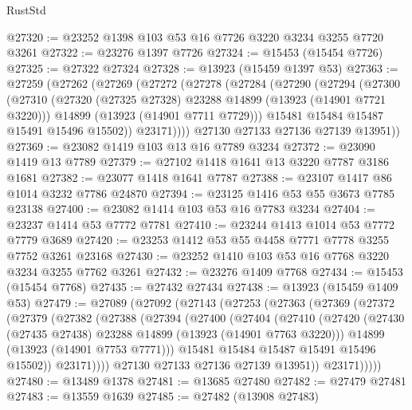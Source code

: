 \begin{lexlean}{RustStd}
\begin{coremodule}
@27320 := @23252 @1398 @103 @53 @16 @7726 @3220 @3234 @3255 @7720 @3261
@27322 := @23276 @1397 @7726
@27324 := @15453 (@15454 @7726)
@27325 := @27322 @27324
@27328 := @13923 (@15459 @1397 @53)
@27363 := @27259
    (@27262
      (@27269
        (@27272
          (@27278
            (@27284
              (@27290
                (@27294
                  (@27300
                    (@27310
                      (@27320 (@27325 @27328) @23288 @14899 (@13923 (@14901 @7721 @3220)))
                      @14899
                      (@13923 (@14901 @7711 @7729)))
                    @15481
                    @15484
                    @15487
                    @15491
                    @15496
                    @15502))
                @23171))))
        @27130
        @27133
        @27136
        @27139
        @13951))
@27369 := @23082 @1419 @103 @13 @16 @7789 @3234
@27372 := @23090 @1419 @13 @7789
@27379 := @27102 @1418 @1641 @13 @3220 @7787 @3186 @1681
@27382 := @23077 @1418 @1641 @7787
@27388 := @23107 @1417 @86 @1014 @3232 @7786 @24870
@27394 := @23125 @1416 @53 @55 @3673 @7785 @23138
@27400 := @23082 @1414 @103 @53 @16 @7783 @3234
@27404 := @23237 @1414 @53 @7772 @7781
@27410 := @23244 @1413 @1014 @53 @7772 @7779 @3689
@27420 := @23253 @1412 @53 @55 @4458 @7771 @7778 @3255 @7752 @3261 @23168
@27430 := @23252 @1410 @103 @53 @16 @7768 @3220 @3234 @3255 @7762 @3261
@27432 := @23276 @1409 @7768
@27434 := @15453 (@15454 @7768)
@27435 := @27432 @27434
@27438 := @13923 (@15459 @1409 @53)
@27479 := @27089
    (@27092
      (@27143
        (@27253
          (@27363
            (@27369
              (@27372
                (@27379
                  (@27382
                    (@27388
                      (@27394
                        (@27400
                          (@27404
                            (@27410
                              (@27420
                                (@27430 (@27435 @27438) @23288 @14899 (@13923 (@14901 @7763 @3220)))
                                @14899
                                (@13923 (@14901 @7753 @7771)))
                              @15481
                              @15484
                              @15487
                              @15491
                              @15496
                              @15502))
                          @23171))))
                  @27130
                  @27133
                  @27136
                  @27139
                  @13951))
              @23171)))))
@27480 := @13489 @1378
@27481 := @13685 @27480
@27482 := @27479 @27481
@27483 := @13559 @1639
@27485 := @27482 (@13908 @27483)

\end{coremodule}
\end{lexlean}
